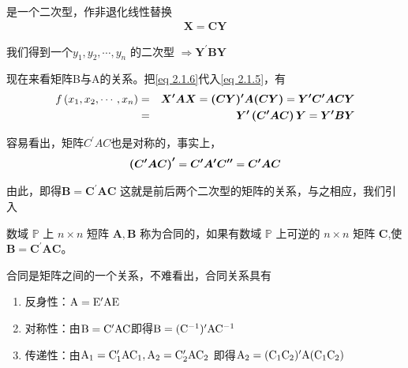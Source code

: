 \begin{enumerate}[ 1) ]
        是一个二次型，作非退化线性替换
        \begin{eqnarray}
			\boldsymbol{X}   = \boldsymbol{CY}  \label{eq 2.1.6}
        \end{eqnarray}

        我们得到一个$ y_{1}, y_{2}, \cdots, y_{n}$ 的二次型
         $  \Longrightarrow \boldsymbol{Y^{\prime} B Y} $ 
         
        \setlength{\parindent}{2\ccwd} 现在来看矩阵B与A的关系。把\eqref{eq 2.1.6}代入\eqref{eq 2.1.5}，有
        \begin{eqnarray}
			f\left(x_{1}, x_{2}, \cdots, x_{n}\right)  & = & \boldsymbol{ X^{\prime} A X } = 
			\boldsymbol{ (C Y)^{\prime} A(C Y) }  =  \boldsymbol{ Y^{\prime} C^{\prime} A C Y }  \notag \\
			& = &{ \boldsymbol{ Y^{\prime}\left(C^{\prime} A C\right) Y} } = \boldsymbol{ Y^{\prime} B Y } \notag
        \end{eqnarray}

        容易看出，矩阵$ C^{\prime} A C $也是对称的，事实上，
        \begin{eqnarray}
			\boldsymbol{ \left(C^{\prime} A C\right)^{\prime} } = \boldsymbol{ C^{\prime} A^{\prime} C^{\prime \prime} }
			= \boldsymbol{ C^{\prime} A C } \notag
        \end{eqnarray}

        由此，即得$ \boldsymbol{ B = C^{\prime} A C }$ 这就是前后两个二次型的矩阵的关系，与之相应，我们引入
        
        \begin{mydef}
			数域  $ \mathbb{ P } $ 上 $ n \times n $ 短阵  $ \boldsymbol{ A, B }$ 称为合同的，如果有数域  $ \mathbb{ P } $  上可逆的
        	$ n \times n $  矩阵  $ \boldsymbol{ C } $,使$ \boldsymbol{ B = C^{\prime} A C } $。
		\end{mydef}

        合同是矩阵之间的一个关系，不难看出，合同关系具有
        \begin{enumerate}[1)]
        	\item 反身性：$ \rm A = E^{\prime} A E $
        	\item 对称性：由$ \rm B = C^{\prime} A C $即得$ \rm B = (C^{-1})^{\prime} A C^{-1} $
        	\item 传递性：由$ \rm A_1 = C_{1}^{\prime} A C_{1} , A_2 = C_{2}^{\prime} A C_{2} $
        	即得$ \rm A_2 = (C_{1} C_{2})^{\prime} A (C_{1} C_{2}) $
        \end{enumerate}	
        \setlength{\parindent}{2\ccwd}	
        

\end{enumerate}
